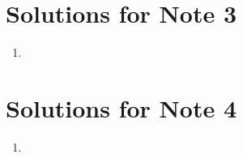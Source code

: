 \documentclass[../main.tex]{subfiles}
\begin{document}
\section{Solutions for Note 3}
\begin{enumerate}
\item
\end{enumerate}

\section{Solutions for Note 4}
\begin{enumerate}
\item
\end{enumerate}
\end{document}
